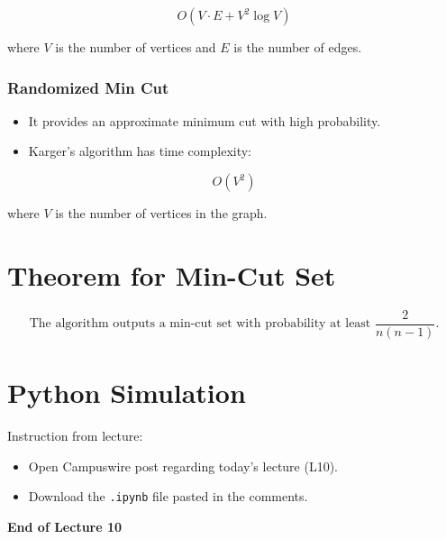 \documentclass[12pt]{article}
\begin{document}
\[
O(V \cdot E + V^2 \log V)
\]

where \( V \) is the number of vertices and \( E \) is the number of edges.

\subsubsection*{Randomized Min Cut}

\begin{itemize}
\item It provides an approximate minimum cut with high probability.
\item Karger’s algorithm has time complexity:
\end{itemize}

\[
O(V^2)
\]

where \( V \) is the number of vertices in the graph.

\section{Theorem for Min-Cut Set}

\[
\text{The algorithm outputs a min-cut set with probability at least } \frac{2}{n(n-1)}.
\]

\section{Python Simulation}

Instruction from lecture:

\begin{itemize}
\item Open Campuswire post regarding today’s lecture (L10).
\item Download the \texttt{.ipynb} file pasted in the comments.
\end{itemize}

\bigskip
\textbf{End of Lecture 10}
\end{document}
